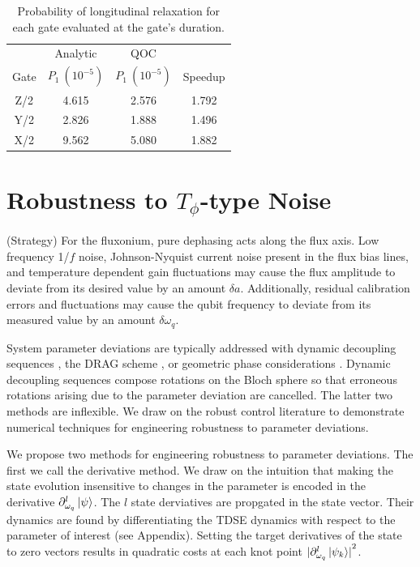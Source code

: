 \documentclass[
  amsfonts,
  amsmath,
  tbtags,
  amssymb,
  aps,
  nobibnotes,
  twocolumn,
]{revtex4-2}
\begin{document}
\begin{table}[h]
  \begin{tabular}{c | c | c | c}
    & Analytic  & QOC &\\
    Gate & $P_{1}\ (10^{-5})$ & $P_{1}\ (10^{-5})$ & Speedup\\
    \hline
    Z/2 & 4.615 & 2.576 & 1.792\\
    Y/2 & 2.826 & 1.888 & 1.496\\
    X/2 & 9.562 & 5.080 & 1.882\\
  \end{tabular}
  \caption{Probability of longitudinal relaxation for each gate
    evaluated at the gate's duration.}
\end{table}


\section{Robustness to $T_{\phi}$-type Noise}
(Strategy) For the fluxonium, pure dephasing acts
along the flux axis. Low frequency 1/$f$ noise,
Johnson-Nyquist current noise present in the flux bias
lines, and temperature dependent gain fluctuations
may cause the flux amplitude to deviate from its
desired value by an amount $\delta a$. Additionally,
residual calibration errors and fluctuations may cause
the qubit frequency to deviate from its measured value
by an amount $\delta \omega_{q}$.

System parameter
deviations are typically addressed with dynamic decoupling
sequences \cite{merrill2014progress},
the DRAG scheme \cite{krantz2019quantum}, or
geometric phase considerations
\cite{xu2020nonadiabatic} \cite{han2020experimental}.
Dynamic decoupling sequences compose rotations on the
Bloch sphere so that erroneous rotations arising due
to the parameter deviation are cancelled.
The latter two methods are inflexible. We draw on the
robust control literature to demonstrate
numerical techniques for engineering robustness
to parameter deviations.

We propose two methods for engineering robustness
to parameter deviations. The first we call the
derivative method. We draw on the intuition that
making the state evolution insensitive to changes
in the parameter is encoded in the derivative
$\partial_{\omega_{q}}^{l} \ket{\psi}$.
The $l$ state derviatives are propgated in the
state vector. Their dynamics are found by differentiating
the TDSE dynamics with respect to the parameter of interest
(see Appendix). Setting the target derivatives of the state
to zero vectors results in quadratic costs at each
knot point
${\lvert \partial_{\omega_{q}}^{l} \ket{\psi_{k}} \rvert}^{2}$.
\end{document}
